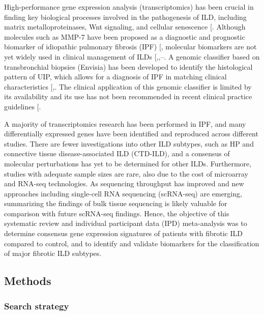 \documentclass[
]{article}
\begin{document}
High-performance gene expression analysis (transcriptomics) has been crucial in finding key biological processes involved in the pathogenesis of ILD, including matrix metalloproteinases, Wnt signaling, and cellular senescence {[}\citeproc{ref-vukmirovic_impact_2018}{33}{]}. Although molecules such as MMP-7 have been proposed as a diagnostic and prognostic biomarker of idiopathic pulmonary fibrosis (IPF) {[}\citeproc{ref-khan_systematic_2022}{34}{]}, molecular biomarkers are not yet widely used in clinical management of ILDs {[},,--\citeproc{ref-johannson_treatment_2021}{37}{]}. A genomic classifier based on transbronchial biopsies (Envisia) has been developed to identify the histological pattern of UIP, which allows for a diagnosis of IPF in matching clinical characteristics {[},\citeproc{ref-choi_analytical_2017}{39}{]}. The clinical application of this genomic classifier is limited by its availability and its use has not been recommended in recent clinical practice guidelines {[}\citeproc{ref-raghu_idiopathic_2022}{2}{]}.

A majority of transcriptomics research has been performed in IPF, and many differentially expressed genes have been identified and reproduced across different studies. There are fewer investigations into other ILD subtypes, such as HP and connective tissue disease-associated ILD (CTD-ILD), and a consensus of molecular perturbations has yet to be determined for other ILDs. Furthermore, studies with adequate sample sizes are rare, also due to the cost of microarray and RNA-seq technologies. As sequencing throughput has improved and new approaches including single-cell RNA sequencing (scRNA-seq) are emerging, summarizing the findings of bulk tissue sequencing is likely valuable for comparison with future scRNA-seq findings. Hence, the objective of this systematic review and individual participant data (IPD) meta-analysis was to determine consensus gene expression signatures of patients with fibrotic ILD compared to control, and to identify and validate biomarkers for the classification of major fibrotic ILD subtypes.

\subsection{Methods}\label{methods}

\subsubsection{Search strategy}\label{search-strategy}
\end{document}
